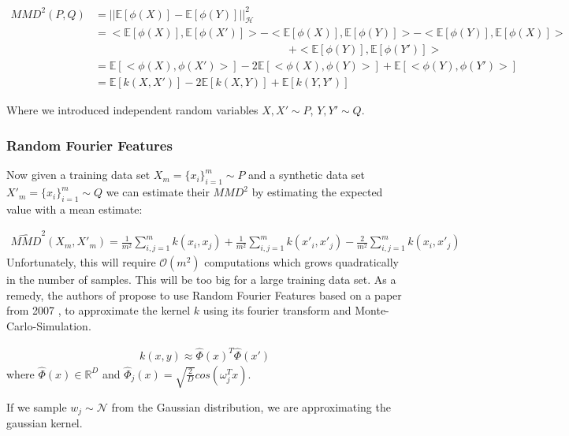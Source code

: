\begin{align}
    MMD^2(P,Q) &= || \mathbb{E}[\phi(X)] - \mathbb{E}[\phi(Y)] ||^2_\mathcal{H} \nonumber \\
    &= <\mathbb{E}[\phi(X)], \mathbb{E}[\phi(X')]> - <\mathbb{E}[\phi(X)], \mathbb{E}[\phi(Y)]> - <\mathbb{E}[\phi(Y)], \mathbb{E}[\phi(X)]> \nonumber \\ &\phantom{mmmmmmmmmmmmmmmmmmmm}+ <\mathbb{E}[\phi(Y)], \mathbb{E}[\phi(Y')]> \nonumber \\
    &= \mathbb{E}[<\phi(X), \phi(X')>] - 2 \mathbb{E}[<\phi(X), \phi(Y)>] + \mathbb{E}[<\phi(Y), \phi(Y')>] \nonumber \\
    &= \mathbb{E}[k(X,X')] - 2 \mathbb{E}[k(X,Y)] + \mathbb{E}[k(Y,Y')]
\end{align}

Where we introduced independent random variables $X,X' \sim P$, $Y,Y' \sim Q$.

\subsubsection{Random Fourier Features}

Now given a training data set $X_m = \{x_i\}_{i=1}^m \sim P$ and a synthetic data set $X'_m = \{x_i\}_{i=1}^m \sim Q$ we can estimate their $MMD^2$ by estimating the expected value with a mean estimate:

\begin{align} \label{eq:mmd}
    \widehat{MMD}^2(X_m, X'_m) = \frac{1}{m^2} \sum_{i,j=1}^m k(x_i,x_j) + \frac{1}{m^2} \sum_{i,j=1}^m k(x'_i,x'_j) - \frac{2}{m^2} \sum_{i,j=1}^m k(x_i,x'_j)
\end{align}
Unfortunately, this will require $\mathcal{O}(m^2)$ computations which grows quadratically in the number of samples. This will be too big for a large training data set. As a remedy, the authors of \parencite{dpmerf} propose to use Random Fourier Features based on a paper from 2007 \parencite[see][]{rff}, to approximate the kernel $k$ using its fourier transform and Monte-Carlo-Simulation.

\begin{align}
    k(x,y) \approx \hat{\Phi}(x)^T \hat{\Phi}(x')
\end{align}
where $\hat{\Phi}(x) \in \mathbb{R}^D$ and $\hat{\Phi}_j(x) = \sqrt{\frac{2}{D}} cos (\omega_j^T x)$.

If we sample $w_j \sim \mathcal{N}$ from the Gaussian distribution, we are approximating the gaussian kernel.

